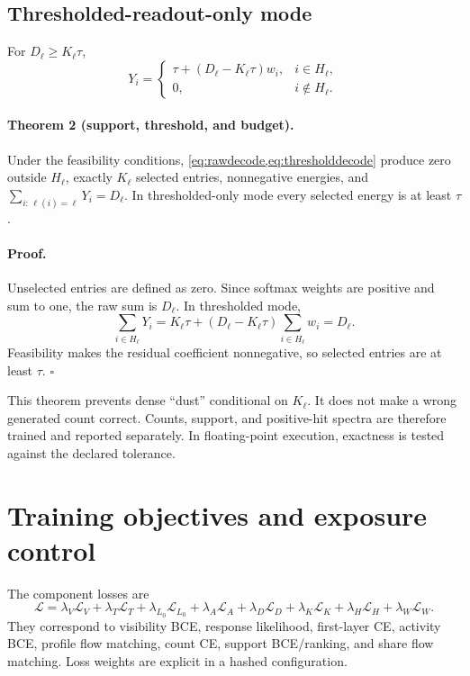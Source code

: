 \documentclass[10pt,a4paper]{article}
\begin{document}
\subsection{Thresholded-readout-only mode}
For $D_\ell\ge K_\ell\tau$,
\begin{equation}
 Y_i=\begin{cases}\tau+(D_\ell-K_\ell\tau)w_i,&i\in H_\ell,\\0,&i\notin H_\ell.\end{cases}
 \label{eq:thresholddecode}
\end{equation}

\paragraph{Theorem 2 (support, threshold, and budget).}
Under the feasibility conditions, \cref{eq:rawdecode,eq:thresholddecode} produce zero outside $H_\ell$, exactly $K_\ell$ selected entries, nonnegative energies, and $\sum_{i:\,\ell(i)=\ell}Y_i=D_\ell$. In thresholded-only mode every selected energy is at least $\tau$.

\paragraph{Proof.}
Unselected entries are defined as zero. Since softmax weights are positive and sum to one, the raw sum is $D_\ell$. In thresholded mode,
\[
 \sum_{i\in H_\ell}Y_i=K_\ell\tau+(D_\ell-K_\ell\tau)\sum_{i\in H_\ell}w_i=D_\ell.
\]
Feasibility makes the residual coefficient nonnegative, so selected entries are at least $\tau$. \hfill$\square$

This theorem prevents dense ``dust'' conditional on $K_\ell$. It does not make a wrong generated count correct. Counts, support, and positive-hit spectra are therefore trained and reported separately. In floating-point execution, exactness is tested against the declared tolerance.

\section{Training objectives and exposure control}

The component losses are
\begin{equation}
\mathcal L=
\lambda_V\mathcal L_V+
\lambda_T\mathcal L_T+
\lambda_{L_0}\mathcal L_{L_0}+
\lambda_A\mathcal L_A+
\lambda_D\mathcal L_D+
\lambda_K\mathcal L_K+
\lambda_H\mathcal L_H+
\lambda_W\mathcal L_W.
\label{eq:ninelosses}
\end{equation}
They correspond to visibility BCE, response likelihood, first-layer CE, activity BCE, profile flow matching, count CE, support BCE/ranking, and share flow matching. Loss weights are explicit in a hashed configuration.
\end{document}
